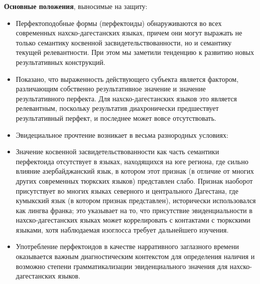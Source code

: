 \par \textbf{Основные положения}, выносимые на защиту:


\begin{itemize}
    \item Перфектоподобные формы (перфектоиды) обнаруживаются во всех современных нахско-дагестанских языках, причем они могут выражать не только семантику косвенной засвидетельствованности, но и семантику текущей релевантности. При этом мы заметили тенденцию к развитию новых результативных конструкций.
    \item Показано, что выраженность действующего субъекта является фактором, различающим собственно результативное значение и значение результативного перфекта. Для нахско-дагестанских языков это является релевантным, поскольку результатив диахронически предшествует результативный перфект, и последнее может вовсе отсутствовать.
    \item Эвидециальное прочтение возникает в весьма разнородных условиях: %
    \item Значение косвенной засвидетельствованности как часть семантики перфектоида отсутствует в языках, находящихся на юге региона, где сильно влияние азербайджанский язык, в котором этот признак (в отличие от многих других современных тюркских языков) представлен слабо. Признак наоборот присутствует во многих языках северного и центрального Дагестана, где кумыкский язык (в котором признак представлен), исторически использовался как лингва франка; это указывает на то, что присутствие эвиденциальности в нахско-дагестанских языках может коррелировать с контактами с тюркскими языками, хотя наблюдаемая изоглосса требует дальнейшего изучения.
    \item Употребление перфектоидов в качестве нарративного заглазного времени оказывается важным диагностическим контекстом для определения наличия и возможно степени грамматикализации эвиденциального значения для нахско-дагестанских языков.
\end{itemize}

